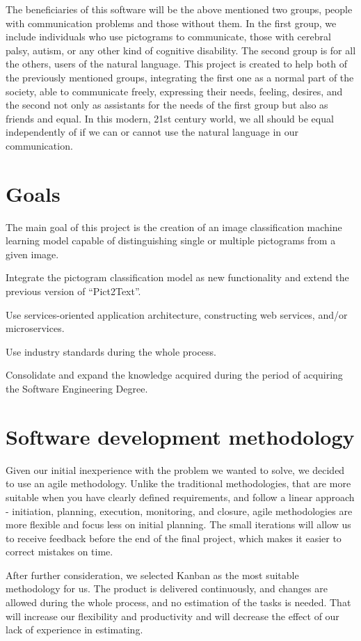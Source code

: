 The beneficiaries of this software will be the above mentioned two groups, people with communication problems and those without them. In the first group, we include individuals who use pictograms to communicate, those with cerebral palsy, autism, or any other kind of cognitive disability. The second group is for all the others, users of the natural language. This project is created to help both of the previously mentioned groups, integrating the first one as a normal part of the society, able to communicate freely, expressing their needs, feeling, desires, and the second not only as assistants for the needs of the first group but also as friends and equal. In this modern, 21st century world, we all should be equal independently of if we can or cannot use the natural language in our communication.


\section{Goals}
The main goal of this project is the creation of an image classification machine learning model capable of distinguishing single or multiple pictograms from a given image. 

Integrate the pictogram classification model as new functionality and extend the previous version of ``Pict2Text''.

Use services-oriented application architecture, constructing web services, and/or microservices.

Use industry standards during the whole process.

Consolidate and expand the knowledge acquired during the period of acquiring the Software Engineering Degree.

\section{Software development methodology}

Given our initial inexperience with the problem we wanted to solve, we decided to use an agile methodology. Unlike the traditional methodologies, that are more suitable when you have clearly defined requirements, and follow a linear approach - initiation, planning, execution, monitoring, and closure, agile methodologies are more flexible and focus less on initial planning. The small iterations will allow us to receive feedback before the end of the final project, which makes it easier to correct mistakes on time. 

After further consideration, we selected Kanban as the most suitable methodology for us. The product is delivered continuously, and changes are allowed during the whole process, and no estimation of the tasks is needed. That will increase our flexibility and productivity and will decrease the effect of our lack of experience in estimating.

